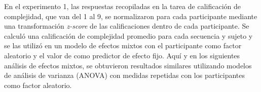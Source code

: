 En el experimento 1, las respuestas recopiladas en la tarea de calificación de complejidad, que van del 1 al 9, se normalizaron para cada participante mediante una transformación \textit{z-score} de las calificaciones dentro de cada participante. Se calculó una calificación de complejidad promedio para cada secuencia y sujeto y se las utilizó en un modelo de efectos mixtos con el participante como factor aleatorio y el valor de \mdlbin como predictor de efecto fijo. Aquí y en los siguientes análisis de efectos mixtos, se obtuvieron resultados similares utilizando modelos de análisis de varianza (ANOVA) con medidas repetidas con los participantes como factor aleatorio.


